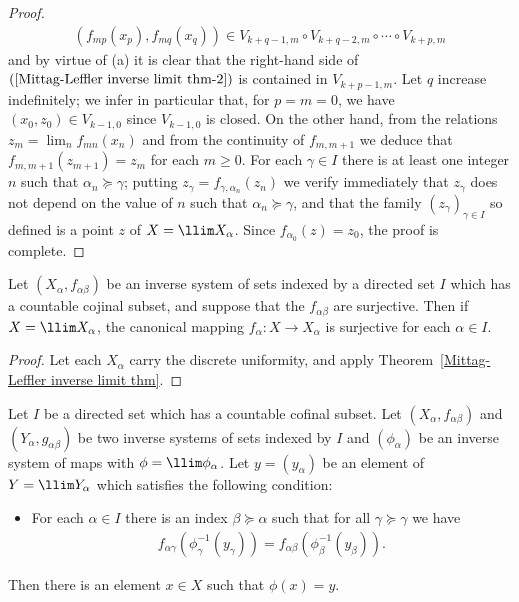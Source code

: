 \begin{proof}
\begin{align}
(f_{mp}(x_p),f_{mq}(x_{q}))\in V_{k+q-1,m}\circ V_{k+q-2,m}\circ\cdots\circ V_{k+p,m}
\end{align}
and by virtue of (a) it is clear that the right-hand side of $(\ref{Mittag-Leffler inverse limit thm-2})$ is contained in $V_{k+p-1,m}$. Let $q$ increase indefinitely; we infer in particular that, for $p=m=0$, we have $(x_0,z_0)\in V_{k-1,0}$ since $V_{k-1,0}$ is closed. On the other hand, from the relations $z_m=\lim_nf_{mn}(x_n)$ and from the continuity  of $f_{m,m+1}$ we deduce that $f_{m,m+1}(z_{m+1})=z_m$ for each $m\geq 0$. For each $\gamma\in I$ there is at least one integer $n$ such that $\alpha_n\succeq\gamma$; putting $z_\gamma=f_{\gamma,\alpha_n}(z_n)$ we verify immediately that $z_\gamma$ does not depend on the value of $n$ such that $\alpha_n\succeq\gamma$, and that the family $(z_\gamma)_{\gamma\in I}$ so defined is a point $z$ of $X=\llim X_\alpha$. Since $f_{\alpha_0}(z)=z_0$, the proof is complete.
\end{proof}
\begin{corollary}\label{set inverse limit countable cofinal surjective}
Let $(X_\alpha,f_{\alpha\beta})$ be an inverse system of sets indexed by a directed set $I$ which has a countable cojinal subset, and suppose that the $f_{\alpha\beta}$ are surjective. Then if $X=\llim X_\alpha$, the canonical mapping $f_\alpha:X\to X_\alpha$ is surjective for each $\alpha\in I$.
\end{corollary}
\begin{proof}
Let each $X_\alpha$ carry the discrete uniformity, and apply Theorem~\ref{Mittag-Leffler inverse limit thm}.
\end{proof}
\begin{corollary}\label{set inverse limit countable cofinal inverse imaege}
Let $I$ be a directed set which has a countable cofinal subset. Let $(X_\alpha,f_{\alpha\beta})$ and $(Y_\alpha,g_{\alpha\beta})$ be two inverse systems of sets indexed by $I$ and $(\phi_\alpha)$ be an inverse system of maps with $\phi=\llim\phi_\alpha$. Let $y=(y_\alpha)$ be an element of $Y=\llim Y_\alpha$ which satisfies the following condition:
\begin{itemize}
\item For each $\alpha\in I$ there is an index $\beta\succeq\alpha$ such that for all $\gamma\succeq\gamma$ we have
\begin{align*}
f_{\alpha\gamma}(\phi_\gamma^{-1}(y_\gamma))=f_{\alpha\beta}(\phi_\beta^{-1}(y_\beta)).
\end{align*}
\end{itemize}
Then there is an element $x\in X$ such that $\phi(x)=y$.
\end{corollary}

